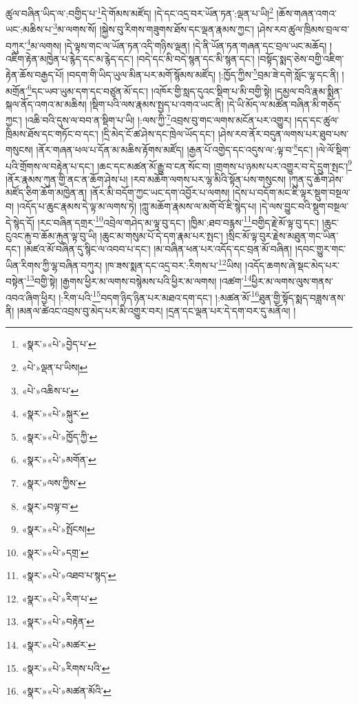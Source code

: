 ཚུལ་བཞིན་ཡིད་ལ་:བགྱིད་པ་\footnote{«སྣར་»«པེ་»བྱེད་པ་}དེ་གོམས་མཛོད། །དེ་དང་འདྲ་བར་ཡོན་ཏན་:ལྡན་པ་ཡི།\footnote{«པེ་»ལྡན་པ་ཡིས།} །ཆོས་གཞན་འགའ་ཡང་:མཆིས་པ་\footnote{«པེ་»འཆིས་པ་}མ་ལགས་སོ། །སྐྱེས་བུ་རིགས་གཟུགས་ཐོས་དང་ལྡན་རྣམས་ཀྱང་། །ཤེས་རབ་ཚུལ་ཁྲིམས་བྲལ་བ་བཀུར་\footnote{«སྣར་»«པེ་»སྐུར་}མ་ལགས། །དེ་ལྟས་གང་ལ་ཡོན་ཏན་འདི་གཉིས་ལྡན། །དེ་ནི་ཡོན་ཏན་གཞན་དང་བྲལ་ཡང་མཆོད། །འཇིག་རྟེན་མཁྱེན་པ་རྙེད་དང་མ་རྙེད་དང་། །བདེ་དང་མི་བདེ་སྙན་དང་མི་སྙན་དང་། །བསྟོད་སྨད་ཅེས་བགྱི་འཇིག་རྟེན་ཆོས་བརྒྱད་པོ། །བདག་གི་ཡིད་ཡུལ་མིན་པར་མགོ་སྙོམས་མཛོད། །:ཁྱོད་ཀྱིས་\footnote{«སྣར་»«པེ་»ཁྱོད་ཀྱི་}བྲམ་ཟེ་དགེ་སློང་ལྷ་དང་ནི། །མགྲོན་\footnote{«སྣར་»«པེ་»མགོན་}དང་ཡབ་ཡུམ་དག་དང་བཙུན་མོ་དང་། །འཁོར་གྱི་སླད་དུའང་སྡིག་པ་མི་བགྱི་སྟེ། །དམྱལ་བའི་རྣམ་སྨིན་སྐལ་ནོད་འགའ་མ་མཆིས། །སྡིག་པའི་ལས་རྣམས་སྤྱད་པ་འགའ་ཡང་ནི། །དེ་ཡི་མོད་ལ་མཚོན་བཞིན་མི་གཅོད་ཀྱང་། །འཆི་བའི་དུས་ལ་བབ་ན་སྡིག་པ་ཡི། །:ལས་ཀྱི་\footnote{«སྣར་»ལས་ཀྱིས་}འབྲས་བུ་གང་ལགས་མངོན་པར་འགྱུར། །དད་དང་ཚུལ་ཁྲིམས་ཐོས་དང་གཏོང་བ་དང་། །དྲི་མེད་ངོ་ཚ་ཤེས་དང་ཁྲེལ་ཡོད་དང་། །ཤེས་རབ་ནོར་བདུན་ལགས་པར་ཐུབ་པས་གསུངས། །ནོར་གཞན་ཕལ་པ་དོན་མ་མཆིས་རྟོགས་མཛོད། །རྒྱན་པོ་འགྱེད་དང་འདུས་ལ་:ལྟ་བ་\footnote{«སྣར་»བལྟ་བ་}དང་། །ལེ་ལོ་སྡིག་པའི་གྲོགས་ལ་བརྟེན་པ་དང་། །ཆང་དང་མཚན་མོ་རྒྱུ་བ་ངན་སོང་བ། །གྲགས་པ་ཉམས་པར་འགྱུར་བ་དེ་དྲུག་སྤང་།\footnote{«སྣར་»«པེ་»སྤོངས།} །ནོར་རྣམས་ཀུན་གྱི་ནང་ན་ཆོག་ཤེས་པ། །རབ་མཆོག་ལགས་པར་ལྷ་མིའི་སྟོན་པས་གསུངས། །ཀུན་དུ་ཆོག་ཤེས་མཛོད་ཅིག་ཆོག་མཁྱེན་ན། །ནོར་མི་བདོག་ཀྱང་ཡང་དག་འབྱོར་པ་ལགས། །དེས་པ་བདོག་མང་ཇི་ལྟར་སྡུག་བསྔལ་བ། །འདོད་པ་ཆུང་རྣམས་དེ་ལྟ་མ་ལགས་ཏེ། །ཀླུ་མཆོག་རྣམས་ལ་མགོ་བོ་ཇི་སྙེད་པ། །དེ་ལས་བྱུང་བའི་སྡུག་བསྔལ་དེ་སྙེད་དོ། །རང་བཞིན་དགྲར་\footnote{«སྣར་»«པེ་»དགྲ་}འབྲེལ་གཤེད་མ་ལྟ་བུ་དང་། །ཁྱིམ་:ཐབ་བརྙས་\footnote{«སྣར་»«པེ་»འཐབ་པ་སྙད་}བགྱིད་རྗེ་མོ་ལྟ་བུ་དང་། །ཆུང་ངུའང་རྐུ་བ་ཆོམ་རྐུན་ལྟ་བུ་ཡི། །ཆུང་མ་གསུམ་པོ་དེ་དག་རྣམ་པར་སྤང་། །སྲིང་མོ་ལྟ་བུར་རྗེས་མཐུན་གང་ཡིན་དང་། །མཛའ་མོ་བཞིན་དུ་སྙིང་ལ་འབབ་པ་དང་། །མ་བཞིན་ཕན་པར་འདོད་དང་བྲན་མོ་བཞིན། །དབང་གྱུར་གང་ཡིན་རིགས་ཀྱི་ལྷ་བཞིན་བཀུར། །ཁ་ཟས་སྨན་དང་འདྲ་བར་:རིགས་པ་\footnote{«སྣར་»«པེ་»རིག་པ་}ཡིས། །འདོད་ཆགས་ཞེ་སྡང་མེད་པར་བསྟེན་\footnote{«སྣར་»«པེ་»བརྟེན་}བགྱི་སྟེ། །རྒྱགས་ཕྱིར་མ་ལགས་བསྙེམས་པའི་ཕྱིར་མ་ལགས། །འཚག་\footnote{«སྣར་»«པེ་»མཚར་}ཕྱིར་མ་ལགས་ལུས་གནས་འབའ་ཞིག་ཕྱིར། །:རིག་པའི་\footnote{«སྣར་»«པེ་»རིགས་པའི་}བདག་ཉིད་ཉིན་པར་མཐའ་དག་དང་། །:མཚན་མོ་\footnote{«སྣར་»«པེ་»མཚན་མོའི་}ཐུན་གྱི་སྟོད་སྨད་བཟླས་ནས་ནི། །མནལ་ཚེའང་འབྲས་བུ་མེད་པར་མི་འགྱུར་བར། །དྲན་དང་ལྡན་པར་དེ་དག་བར་དུ་མནོལ། །
